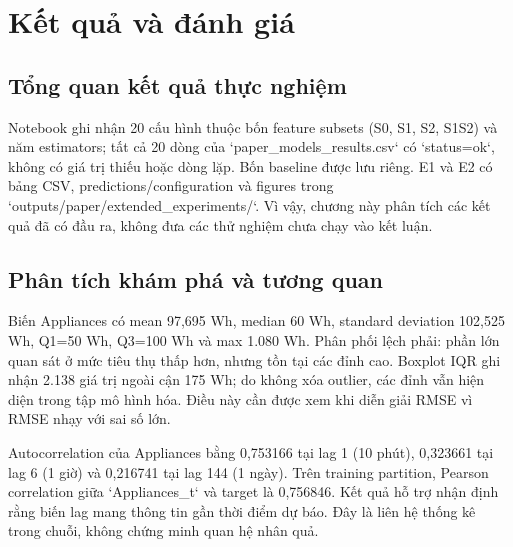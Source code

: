 \chapter{Kết quả và đánh giá}\label{chap:10}

\section{Tổng quan kết quả thực nghiệm}\label{tux1ed5ng-quan-kux1ebft-quux1ea3-thux1ef1c-nghiux1ec7m}

Notebook ghi nhận 20 cấu hình thuộc bốn feature subsets (S0, S1, S2, S1S2) và năm estimators; tất cả 20 dòng của `paper\_models\_results.csv` có `status=ok`, không có giá trị thiếu hoặc dòng lặp. Bốn baseline được lưu riêng. E1 và E2 có bảng CSV, predictions/configuration và figures trong `outputs/paper/extended\_experiments/`. Vì vậy, chương này phân tích các kết quả đã có đầu ra, không đưa các thử nghiệm chưa chạy vào kết luận.

\section{Phân tích khám phá và tương quan}\label{phuxe2n-tuxedch-khuxe1m-phuxe1-vuxe0-tux1b0ux1a1ng-quan}

Biến Appliances có mean 97,695 Wh, median 60 Wh, standard deviation 102,525 Wh, Q1=50 Wh, Q3=100 Wh và max 1.080 Wh. Phân phối lệch phải: phần lớn quan sát ở mức tiêu thụ thấp hơn, nhưng tồn tại các đỉnh cao. Boxplot IQR ghi nhận 2.138 giá trị ngoài cận 175 Wh; do không xóa outlier, các đỉnh vẫn hiện diện trong tập mô hình hóa. Điều này cần được xem khi diễn giải RMSE vì RMSE nhạy với sai số lớn.

Autocorrelation của Appliances bằng 0,753166 tại lag 1 (10 phút), 0,323661 tại lag 6 (1 giờ) và 0,216741 tại lag 144 (1 ngày). Trên training partition, Pearson correlation giữa `Appliances\_t` và target là 0,756846. Kết quả hỗ trợ nhận định rằng biến lag mang thông tin gần thời điểm dự báo. Đây là liên hệ thống kê trong chuỗi, không chứng minh quan hệ nhân quả.

